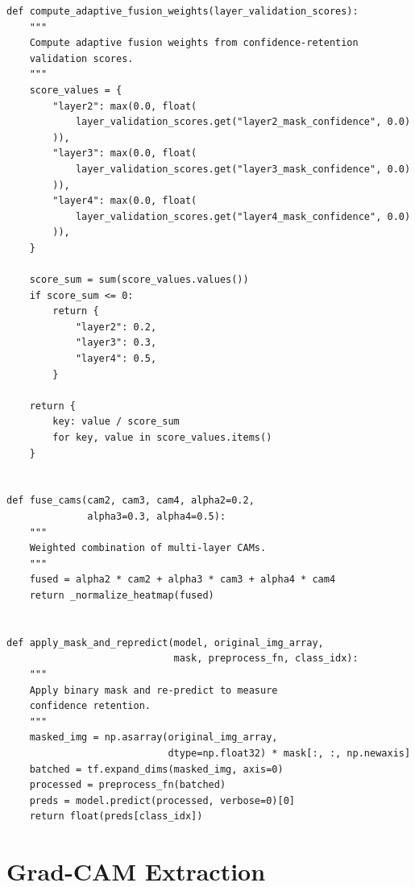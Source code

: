 \documentclass[12pt,a4paper,oneside]{book}
\begin{document}
\begin{lstlisting}
def compute_adaptive_fusion_weights(layer_validation_scores):
    """
    Compute adaptive fusion weights from confidence-retention 
    validation scores.
    """
    score_values = {
        "layer2": max(0.0, float(
            layer_validation_scores.get("layer2_mask_confidence", 0.0)
        )),
        "layer3": max(0.0, float(
            layer_validation_scores.get("layer3_mask_confidence", 0.0)
        )),
        "layer4": max(0.0, float(
            layer_validation_scores.get("layer4_mask_confidence", 0.0)
        )),
    }
    
    score_sum = sum(score_values.values())
    if score_sum <= 0:
        return {
            "layer2": 0.2,
            "layer3": 0.3,
            "layer4": 0.5,
        }
    
    return {
        key: value / score_sum 
        for key, value in score_values.items()
    }


def fuse_cams(cam2, cam3, cam4, alpha2=0.2, 
              alpha3=0.3, alpha4=0.5):
    """
    Weighted combination of multi-layer CAMs.
    """
    fused = alpha2 * cam2 + alpha3 * cam3 + alpha4 * cam4
    return _normalize_heatmap(fused)


def apply_mask_and_repredict(model, original_img_array, 
                             mask, preprocess_fn, class_idx):
    """
    Apply binary mask and re-predict to measure 
    confidence retention.
    """
    masked_img = np.asarray(original_img_array, 
                            dtype=np.float32) * mask[:, :, np.newaxis]
    batched = tf.expand_dims(masked_img, axis=0)
    processed = preprocess_fn(batched)
    preds = model.predict(processed, verbose=0)[0]
    return float(preds[class_idx])
\end{lstlisting}

\section{Grad-CAM Extraction}
\end{document}

